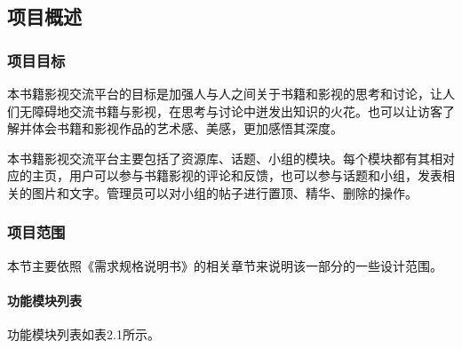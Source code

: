 \documentclass[
]{article}
\begin{document}
\hypertarget{header-n70}{%
\subsection{项目概述}\label{header-n70}}

\hypertarget{header-n71}{%
\subsubsection{项目目标}\label{header-n71}}

本书籍影视交流平台的目标是加强人与人之间关于书籍和影视的思考和讨论，让人们无障碍地交流书籍与影视，在思考与讨论中迸发出知识的火花。也可以让访客了解并体会书籍和影视作品的艺术感、美感，更加感悟其深度。

本书籍影视交流平台主要包括了资源库、话题、小组的模块。每个模块都有其相对应的主页，用户可以参与书籍影视的评论和反馈，也可以参与话题和小组，发表相关的图片和文字。管理员可以对小组的帖子进行置顶、精华、删除的操作。

\hypertarget{header-n74}{%
\subsubsection{项目范围}\label{header-n74}}

本节主要依照《需求规格说明书》的相关章节来说明该一部分的一些设计范围。

\hypertarget{header-n76}{%
\paragraph{功能模块列表}\label{header-n76}}

功能模块列表如表2.1所示。
\end{document}
